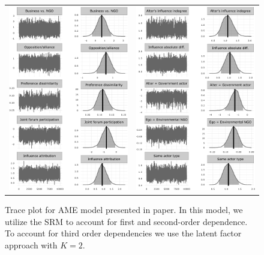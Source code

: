 \documentclass[12pt,pdflatex]{elsarticle}
\begin{document}
\begin{figure}[ht]
	\centering
	\begin{tabular}{cc}
	\includegraphics[width=.45\textwidth]{ameConv1_SR2} &
	\includegraphics[width=.45\textwidth]{ameConv2_SR2}
	\end{tabular}
	\caption{Trace plot for AME model presented in paper. In this model, we utilize the SRM to account for first and second-order dependence. To account for third order dependencies we use the latent factor approach with $K=2$.}
	\label{fig:ameConv}
\end{figure}
\FloatBarrier
\newpage
\end{document}

